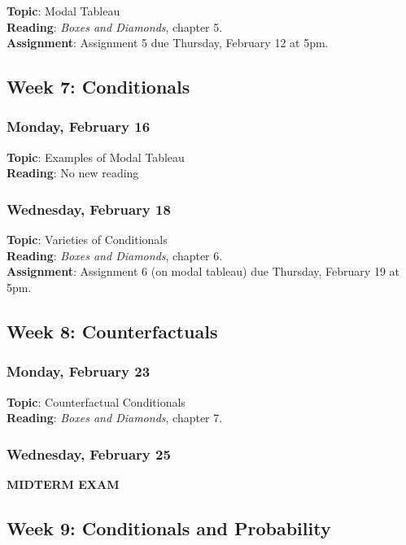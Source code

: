 \documentclass[
  letterpaper,
  DIV=11,
  numbers=noendperiod]{scrartcl}
\begin{document}
\textbf{Topic}: Modal Tableau\\
\textbf{Reading}: \emph{Boxes and Diamonds}, chapter 5.\\
\textbf{Assignment}: Assignment 5 due Thursday, February 12 at 5pm.

\subsection{Week 7: Conditionals}\label{week-7-conditionals}

\subsubsection{Monday, February 16}\label{monday-february-16}

\textbf{Topic}: Examples of Modal Tableau\\
\textbf{Reading}: No new reading

\subsubsection{Wednesday, February 18}\label{wednesday-february-18}

\textbf{Topic}: Varieties of Conditionals\\
\textbf{Reading}: \emph{Boxes and Diamonds}, chapter 6.\\
\textbf{Assignment}: Assignment 6 (on modal tableau) due Thursday,
February 19 at 5pm.

\subsection{Week 8: Counterfactuals}\label{week-8-counterfactuals}

\subsubsection{Monday, February 23}\label{monday-february-23}

\textbf{Topic}: Counterfactual Conditionals\\
\textbf{Reading}: \emph{Boxes and Diamonds}, chapter 7.

\subsubsection{Wednesday, February 25}\label{wednesday-february-25}

\textbf{MIDTERM EXAM}

\subsection{Week 9: Conditionals and
Probability}\label{week-9-conditionals-and-probability}
\end{document}
